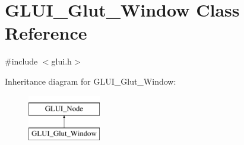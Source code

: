 \hypertarget{classGLUI__Glut__Window}{\section{G\-L\-U\-I\-\_\-\-Glut\-\_\-\-Window Class Reference}
\label{classGLUI__Glut__Window}
}


{\ttfamily \#include $<$glui.\-h$>$}

Inheritance diagram for G\-L\-U\-I\-\_\-\-Glut\-\_\-\-Window\-:\begin{figure}[H]
\begin{center}
\leavevmode
\includegraphics[height=2.000000cm]{classGLUI__Glut__Window}
\end{center}
\end{figure}

